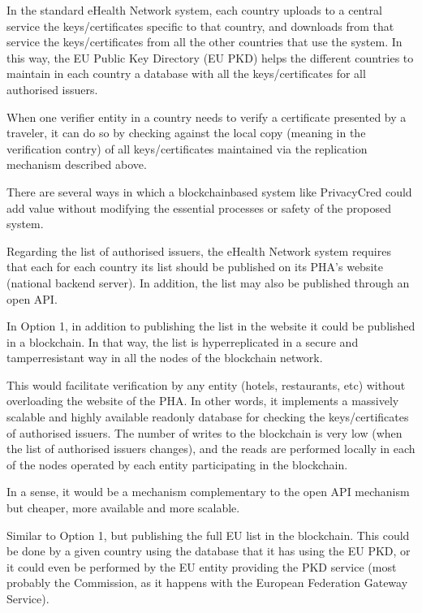 \documentclass[a4paper,12pt,english]{sphinxhowto}
\begin{document}
\sphinxAtStartPar
In the standard eHealth Network system, each country uploads to a central service the keys/certificates specific to that country, and downloads from that service the keys/certificates from all the other countries that use the system. In this way, the EU Public Key Directory (EU PKD) helps the different countries to maintain in each country a database with all the keys/certificates for all authorised issuers.

\sphinxAtStartPar
When one verifier entity in a country needs to verify a certificate presented by a traveler, it can do so by checking against the local copy (meaning in the verification contry) of all keys/certificates maintained via the replication mechanism described above.

\sphinxAtStartPar
There are several ways in which a blockchain\sphinxhyphen{}based system like PrivacyCred could add value without modifying the essential processes or safety of the proposed system.

\sphinxAtStartPar
{}

\sphinxAtStartPar
Regarding the list of authorised issuers, the eHealth Network system requires that each for each country its list should be published on its PHA’s website (national backend server). In addition, the list may also be published through an open API.

\sphinxAtStartPar
In Option 1, in addition to publishing the list in the website it could be published in a blockchain. In that way, the list is hyper\sphinxhyphen{}replicated in a secure and tamper\sphinxhyphen{}resistant way in all the nodes of the blockchain network.

\sphinxAtStartPar
This would facilitate verification by any entity (hotels, restaurants, etc) without overloading the website of the PHA. In other words, it implements a massively scalable and highly available read\sphinxhyphen{}only database for checking the keys/certificates of authorised issuers. The number of writes to the blockchain is very low (when the list of authorised issuers changes), and the reads are performed locally in each of the nodes operated by each entity participating in the blockchain.

\sphinxAtStartPar
In a sense, it would be a mechanism complementary to the open API mechanism but cheaper, more available and more scalable.

\sphinxAtStartPar
{}

\sphinxAtStartPar
Similar to Option 1, but publishing the full EU list in the blockchain. This could be done by a given country using the database that it has using the EU PKD, or it could even be performed by the EU entity providing the PKD service (most probably the Commission, as it happens with the European Federation Gateway Service).
\end{document}
